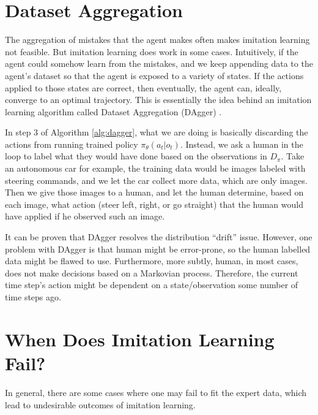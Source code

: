 \section{Dataset Aggregation}
The aggregation of mistakes that the agent makes often makes imitation learning not feasible. But imitation learning does work in some cases. Intuitively, if the agent could somehow learn from the mistakes, and we keep appending data to the agent's dataset so that the agent is exposed to a variety of states. If the actions applied to those states are correct, then eventually, the agent can, ideally, converge to an optimal trajectory. This is essentially the idea behind an imitation learning algorithm called Dataset Aggregation (DAgger) \cite{ross2011reduction}.

In step 3 of Algorithm \ref{alg:dagger}, what we are doing is basically discarding the actions from running trained policy $\pi_\theta(a_t|o_t)$. Instead, we ask a human in the loop to label what they would have done based on the observations in $D_\pi$. Take an autonomous car for example, the training data would be images labeled with steering commands, and we let the car collect more data, which are only images. Then we give those images to a human, and let the human determine, based on each image, what action (steer left, right, or go straight) that the human would have applied if he observed such an image.

It can be proven that DAgger resolves the distribution ``drift'' issue. However, one problem with DAgger is that human might be error-prone, so the human labelled data might be flawed to use. Furthermore, more subtly, human, in most cases, does not make decisions based on a Markovian process. Therefore, the current time step's action might be dependent on a state/observation some number of time steps ago.
\section{When Does Imitation Learning Fail?}
In general, there are some cases where one may fail to fit the expert data, which lead to undesirable outcomes of imitation learning.
